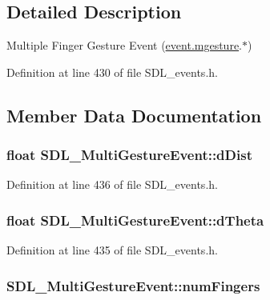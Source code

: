 \subsection{Detailed Description}
Multiple Finger Gesture Event (\hyperlink{union_s_d_l___event_ac19b3c6a6b5181a51eb4fbe2cbe726a9}{event.\-mgesture}.$\ast$) 

Definition at line 430 of file S\-D\-L\-\_\-events.\-h.



\subsection{Member Data Documentation}
\hypertarget{struct_s_d_l___multi_gesture_event_a351c29785c5ce3f68c4591a427265f14}{
\subsubsection[{d\-Dist}]{\setlength{\rightskip}{0pt plus 5cm}float S\-D\-L\-\_\-\-Multi\-Gesture\-Event\-::d\-Dist}}\label{struct_s_d_l___multi_gesture_event_a351c29785c5ce3f68c4591a427265f14}


Definition at line 436 of file S\-D\-L\-\_\-events.\-h.

\hypertarget{struct_s_d_l___multi_gesture_event_a4f4a920dcf5205baa24a140df56f3153}{
\subsubsection[{d\-Theta}]{\setlength{\rightskip}{0pt plus 5cm}float S\-D\-L\-\_\-\-Multi\-Gesture\-Event\-::d\-Theta}}\label{struct_s_d_l___multi_gesture_event_a4f4a920dcf5205baa24a140df56f3153}


Definition at line 435 of file S\-D\-L\-\_\-events.\-h.

\hypertarget{struct_s_d_l___multi_gesture_event_a6b06cf80372ce3cad40110fdb6ef0353}{
\subsubsection[{num\-Fingers}]{ S\-D\-L\-\_\-\-Multi\-Gesture\-Event\-::num\-Fingers}}\label{struct_s_d_l___multi_gesture_event_a6b06cf80372ce3cad40110fdb6ef0353}



